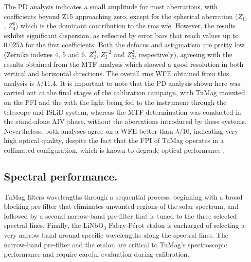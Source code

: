 The PD analysis indicates a small amplitude for most aberrations, with coefficients beyond Z15 approaching zero, except for the spherical aberration ($Z_{11}$, $Z_4 ^0$) which is the dominant contribution to the rms wfe. However, the results exhibit significant dispersion, as reflected by error bars that reach values up to 0.025$\lambda$ for the first coefficients. Both the defocus and astigmatism are pretty low (Zernike indexes 4, 5 and 6, $Z _ 2 ^0$, $Z _ 2 ^{-2}$ and $Z _ 2 ^2$, respectively), agreeing with the results obtained from the MTF analysis which showed a good resolution in both vertical and horizontal directions. The overall rms WFE obtained from this analysis is $\lambda / 11.4$. It is important to note that the PD analysis shown here was carried out at the final stages of the calibration campaign, with TuMag mounted on the PFI and the with the light being fed to the instrument through the telescope and ISLiD system, whereas the MTF determination was conducted in the stand-alone AIV phase, without the aberrations introduced by these systems. Nevertheless, both analyses agree on a WFE better than $\lambda / 10$, indicating very high optical quality, despite the fact that the FPI of TuMag operates in a collimated configuration, which is known to degrade optical performance \citep{ghosts-etalon}.

\subsection{Spectral performance.}

TuMag filters wavelengths through a sequential process, beginning with a broad blocking pre-filter that eliminates unwanted regions of the solar spectrum, and followed by a second narrow-band pre-filter that is tuned to the three selected spectral lines. Finally, the LiNbO$_3$ Fabry-Pérot etalon is encharged of selecting a very narrow band around specific wavelengths along the spectral lines. The narrow-band pre-filter and the etalon are critical to TuMag's spectroscopic performance and require careful evaluation during calibration.


